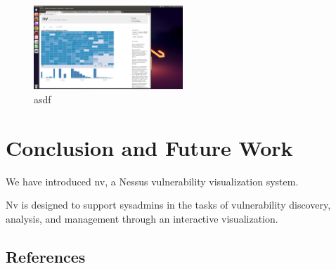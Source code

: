 \documentclass{acm_proc_article-sp}
\begin{document}
\begin{figure}
  \centering
  \includegraphics[width=0.5\textwidth]{../screenshots/final/VASTWorkstationPort}
  \caption{asdf}
\end{figure}

\section{Conclusion and Future Work}

We have introduced nv, a Nessus vulnerability visualization system.

Nv is designed to support sysadmins in the tasks of vulnerability discovery, analysis, and management through an interactive visualization.





\subsection{References}
\end{document}
